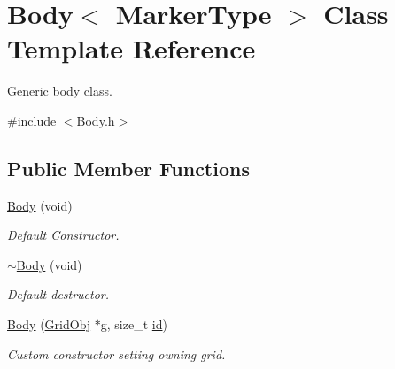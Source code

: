\hypertarget{class_body}{}\section{Body$<$ Marker\+Type $>$ Class Template Reference}
\label{class_body}


Generic body class.  




{\ttfamily \#include $<$Body.\+h$>$}

\subsection*{Public Member Functions}
\begin{DoxyCompactItemize}
\item 
\hyperlink{class_body_a684a431c9215429149f36949ab007353}{Body} (void)
\begin{DoxyCompactList}\small\item\em Default Constructor. \end{DoxyCompactList}\item 
\hyperlink{class_body_a62fb64b91f20eeef2d454994bdbc8b37}{$\sim$\+Body} (void)
\begin{DoxyCompactList}\small\item\em Default destructor. \end{DoxyCompactList}\item 
\hyperlink{class_body_a5b5eaa43a6dcf5e3fdd996c126aa21ea}{Body} (\hyperlink{class_grid_obj}{Grid\+Obj} $\ast$g, size\+\_\+t \hyperlink{class_body_a9d5166d7419f303190b6c6543e67e815}{id})
\begin{DoxyCompactList}\small\item\em Custom constructor setting owning grid. \end{DoxyCompactList}\end{DoxyCompactItemize}
